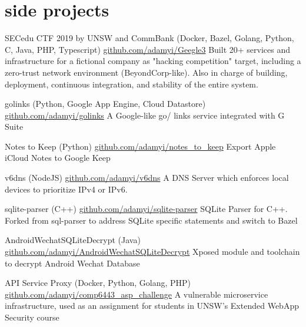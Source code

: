 \documentclass[hidelinks__VERSION__]{adamyi-cv}
\begin{document}

\section{side projects}

\begin{entrylist}


\entry
{SECedu CTF 2019 by UNSW and CommBank (Docker, Bazel, Golang, Python, C, Java, PHP, Typescript)}
{\href{https://github.com/adamyi/Geegle3}{github.com/adamyi/Geegle3}}
{Built 20+ services and infrastructure for a fictional company as "hacking competition" target, including a zero-trust network environment (BeyondCorp-like). Also in charge of building, deployment, continuous integration, and stability of the entire system.}


\entry
{golinks (Python, Google App Engine, Cloud Datastore)}
{\href{https://github.com/adamyi/golinks}{github.com/adamyi/golinks}}
{A Google-like go/ links service integrated with G Suite}


\entry
{Notes to Keep (Python)}
{\href{https://github.com/adamyi/notes_to_keep}{github.com/adamyi/notes\_to\_keep}}
{Export Apple iCloud Notes to Google Keep}


\entry
{v6dns (NodeJS)}
{\href{https://github.com/adamyi/v6dns}{github.com/adamyi/v6dns}}
{A DNS Server which enforces local devices to prioritize IPv4 or IPv6.}


\entry
{sqlite-parser (C++)}
{\href{https://github.com/adamyi/sqlite-parser}{github.com/adamyi/sqlite-parser}}
{SQLite Parser for C++. Forked from sql-parser to address SQLite specific statements and switch to Bazel}


\entry
{AndroidWechatSQLiteDecrypt (Java)}
{\href{https://github.com/adamyi/AndroidWechatSQLiteDecrypt}{github.com/adamyi/AndroidWechatSQLiteDecrypt}}
{Xposed module and toolchain to decrypt Android Wechat Database}


\entry
{API Service Proxy (Docker, Python, Golang, PHP)}
{\href{https://github.com/adamyi/comp6443_asp_challenge}{github.com/adamyi/comp6443\_asp\_challenge}}
{A vulnerable microservice infrastructure, used as an assignment for students in UNSW's Extended WebApp Security course}


\end{entrylist}
\end{document}
